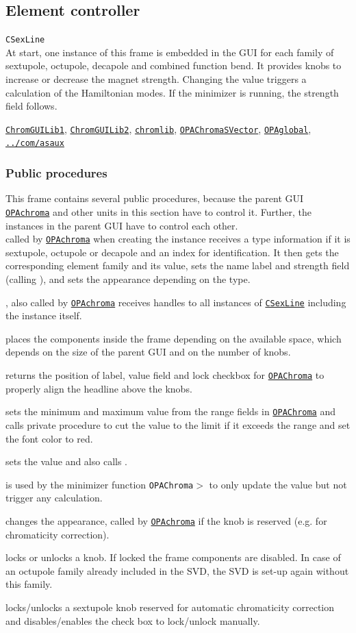 \documentclass[12pt]{article}
\newcommand\code[1]{{\tt #1}}
\newcommand\guico[1]{{\color{blue}\code{#1}}}
\newcommand\guifco[1]{{\color{violet}\code{#1}}}
\newcommand{\grcod}[2]{\opagui{#1}$>$\guico{#2}}
\newcommand{\opagui}[1]{\colorbox{blue!20}{\code{#1}}}
\newcommand{\ogui}[1]{\hyperref[#1]{\opagui{#1}}}
\newcommand{\opaguif}[1]{\colorbox{violet!30}{\code{#1}}}
\newcommand{\oguifh}[2]{\subsection{\label{#2}#1}{\Huge\opaguif{#2}}\\}
\newcommand{\oguif}[1]{\hyperref[#1]{\opaguif{#1}}}
\newcommand{\opauni}[1]{\colorbox{orange!30}{\code{#1}}}
\newcommand{\ouni}[1]{\hyperref[#1]{\opauni{#1}}}
\newcommand{\uses}[1]{\flushleft {\bf Uses:} #1}
\newcommand{\desc}[1]{#1}
\newcommand{\ppro}[1]{\subsubsection*{Public procedures} #1}
\begin{document}
\oguifh{Element controller}{CSexLine} 

\desc{At start, one instance of this frame is embedded in the GUI for each family of sextupole, octupole, decapole and combined function bend. It provides knobs to increase or decrease the magnet strength. Changing the value triggers a calculation of the Hamiltonian modes. If the minimizer is running, the strength field follows.}

\uses{
\ouni{ChromGUILib1}, \ouni{ChromGUILib2}, \ouni{chromlib}, \ogui{OPAChromaSVector},  \ouni{OPAglobal}, \ouni{../com/asaux}
}

\ppro{
This frame contains several public procedures, because the parent GUI \ogui{OPAchroma} and other units in this section have to control it. Further, the instances in the parent GUI have to control each other.\\

\guifco{Init} called by \ogui{OPAchroma} when creating the instance receives a type information if it is sextupole, octupole or decapole and an index for identification. It then gets the corresponding element family and its value, sets the name label and strength field (calling \guifco{SetVal}), and sets the appearance depending on the type.

\guifco{Brothers}, also called by \ogui{OPAchroma} receives handles to all instances of \oguif{CSexLine} including the instance itself.

\guifco{SetSize} places the components inside the frame depending on the available space, which depends on the size of the parent GUI and on the number of knobs.

\guifco{getTabs} returns the position of label, value field and lock checkbox for \ogui{OPAChroma} to properly align the headline above the knobs.

\guifco{SetRange} sets the minimum and maximum value from the range fields in \ogui{OPAChroma} and calls private procedure \guifco{LimitVal} to cut the value to the limit if it exceeds the range and set the font color to red.

\guifco{SetVal} sets the value and also calls \guifco{LimitVal}.

\guifco{UpdateValbyMin} is used by the minimizer function \grcod{OPAChroma}{PenaltyFunction} to only update the value but not trigger any calculation.

\guifco{mySetColor} changes the appearance, called by \ogui{OPAchroma} if the knob is reserved (e.g. for chromaticity correction).

\guifco{Lock,UnLock} locks or unlocks a knob. If locked the frame components are disabled. In case of an octupole family already included in the SVD, the SVD is set-up again without this family.

\guifco{Chrom(Lock,Unlock)} locks/unlocks a sextupole knob reserved for automatic chromaticity correction and disables/enables the check box to lock/unlock manually.
}
\end{document}
